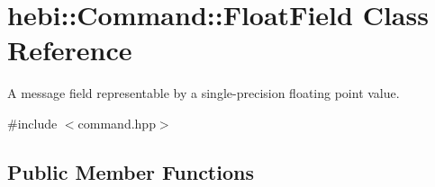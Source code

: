\hypertarget{classhebi_1_1Command_1_1FloatField}{}\section{hebi\+:\+:Command\+:\+:Float\+Field Class Reference}
\label{classhebi_1_1Command_1_1FloatField}


A message field representable by a single-\/precision floating point value.  




{\ttfamily \#include $<$command.\+hpp$>$}

\subsection*{Public Member Functions}
